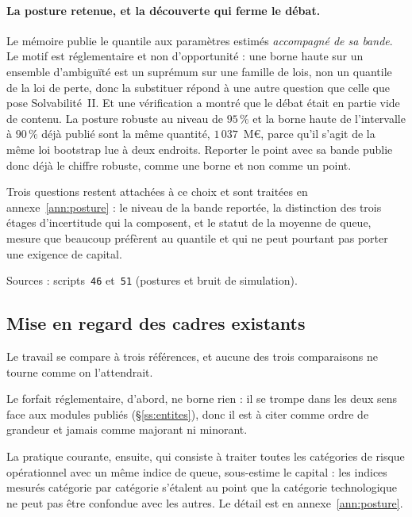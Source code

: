 \documentclass[12pt,a4paper]{article}
\theoremstyle{definition}
\begin{document}
\paragraph{La posture retenue, et la découverte qui ferme le débat.} Le mémoire
publie le quantile aux paramètres estimés \emph{accompagné de sa bande}. Le motif
est réglementaire et non d'opportunité : une borne haute sur un ensemble
d'ambiguïté est un suprémum sur une famille de lois, non un quantile de la loi de
perte, donc la substituer répond à une autre question que celle que pose
Solvabilité~II. Et une vérification a montré que le débat était en partie vide de
contenu. La posture robuste au niveau de $95\,\%$ et la borne haute de l'intervalle
à $90\,\%$ déjà publié sont la même quantité, $1\,037$~M\euro, parce qu'il s'agit
de la même loi bootstrap lue à deux endroits. Reporter le point avec sa
bande publie donc déjà le chiffre robuste, comme une borne et non comme un point.

Trois questions restent attachées à ce choix et sont traitées en
annexe~\ref{ann:posture} : le niveau de la bande reportée, la distinction des trois
étages d'incertitude qui la composent, et le statut de la moyenne de queue, mesure
que beaucoup préfèrent au quantile et qui ne peut pourtant pas porter une exigence
de capital.

\vspace{4pt}
\noindent Sources : scripts~\texttt{46} et~\texttt{51} (postures et bruit de
simulation).

\subsection{Mise en regard des cadres existants}
\label{ss:regard}

Le travail se compare à trois références, et aucune des trois comparaisons ne
tourne comme on l'attendrait.

Le forfait réglementaire, d'abord, ne borne rien : il se trompe dans les deux sens
face aux modules publiés (\S\ref{ss:entites}), donc il est à citer comme ordre de
grandeur et jamais comme majorant ni minorant.

La pratique courante, ensuite, qui consiste à traiter toutes les catégories de
risque opérationnel avec un même indice de queue, sous-estime le capital : les
indices mesurés catégorie par catégorie s'étalent au point que la catégorie
technologique ne peut pas être confondue avec les autres. Le détail est en
annexe~\ref{ann:posture}.
\end{document}
